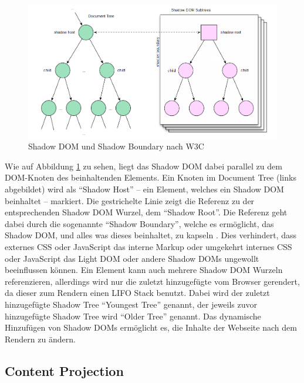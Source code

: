 \begin{figure}[htbp]
 \centering
 \includegraphics[width=\linewidth]{kapitel2/bilder/3-shadow-dom-shadow-boundary}
 \caption{Shadow \ac{DOM} und Shadow Boundary nach W3C}
 \label{fig:sdsbnw3c}
\end{figure}

Wie auf Abbildung \ref{fig:sdsbnw3c} zu sehen, liegt das Shadow \ac{DOM} dabei parallel zu dem \ac{DOM}-Knoten des beinhaltenden Elements. Ein Knoten im Document Tree (links abgebildet) wird als ``Shadow Host'' -- ein Element, welches ein Shadow \ac{DOM} beinhaltet -- markiert. Die gestrichelte Linie zeigt die Referenz zu der entsprechenden Shadow \ac{DOM} Wurzel, dem ``Shadow Root''. Die Referenz geht dabei durch die sogenannte ``Shadow Boundary'', welche es ermöglicht, das Shadow \ac{DOM}, und alles was dieses beinhaltet, zu kapseln \cite{citeulike:13851350}. Dies verhindert, dass externes \ac{CSS} oder JavaScript das interne Markup oder umgekehrt internes \ac{CSS} oder JavaScript das Light \ac{DOM} oder andere Shadow \ac{DOM}s ungewollt beeinflussen können. Ein Element kann auch mehrere Shadow \ac{DOM} Wurzeln referenzieren, allerdings wird nur die zuletzt hinzugefügte vom Browser gerendert, da dieser zum Rendern einen \ac{LIFO} Stack benutzt. Dabei wird der zuletzt hinzugefügte Shadow Tree ``Youngest Tree'' genannt, der jeweils zuvor hinzugefügte Shadow Tree wird ``Older Tree'' genannt. Das dynamische Hinzufügen von Shadow \ac{DOM}s ermöglicht es, die Inhalte der Webseite nach dem Rendern zu ändern.


\subsection{Content Projection}\label{content-projection}

